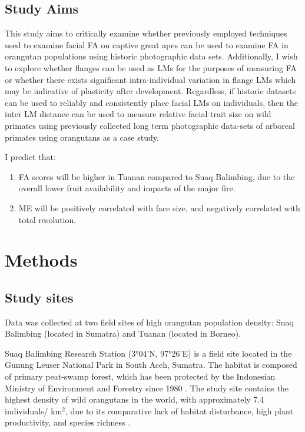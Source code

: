 \subsection{Study Aims}

This study aims to critically examine whether previously employed techniques used to examine facial FA on captive great apes can be used to examine FA in orangutan populations using historic photographic data sets. Additionally, I wish to explore whether flanges can be used as LMs for the purposes of measuring FA or whether there exists significant intra-individual variation in flange LMs which may be indicative of plasticity after development. Regardless, if historic datasets can be used to reliably and consistently place facial LMs on individuals, then the inter LM distance can be used to measure relative facial trait size on wild primates using previously collected long term photographic data-sets of arboreal primates using orangutans as a case study.

I predict that:
\begin{enumerate}
    \item FA scores will be higher in Tuanan compared to Suaq Balimbing, due to the overall lower fruit availability and impacts of the major fire.
    \item ME will be positively correlated with face size, and negatively correlated with total resolution.
\end{enumerate}

\section{Methods}
\subsection{Study sites}
Data was collected at two field sites of high orangutan population density: Suaq Balimbing (located in Sumatra) and Tuanan (located in Borneo). 

Suaq Balimbing Research Station (3°04'N, 97°26'E) is a field site located in the Gunung Leuser National Park in South Aceh, Sumatra. The habitat is composed of primary peat-swamp forest, which has been protected by the Indonesian Ministry of Environment and Forestry since 1980 \citep{Sutekad.2022}. The study site contains the highest density of wild orangutans in the world, with approximately 7.4 individuals/ km$^{2}$, due to its comparative lack of habitat disturbance, high plant productivity, and species richness \citep{Husson.2008}. 

